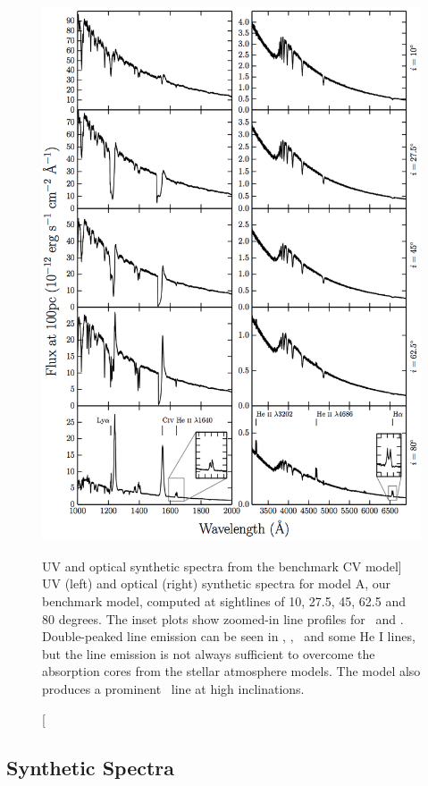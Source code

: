 \begin{figure}
\centering
\includegraphics[width=1.0\textwidth]{figures/05-cvpaper/modela_uv_opt.png}
\caption
[UV and optical synthetic spectra from the benchmark CV model]{
UV (left) and optical (right) synthetic spectra for model A, our benchmark model,
computed at sightlines of 10, 27.5, 45, 62.5 and 80 degrees.	
The inset plots show zoomed-in line profiles for 
\heiiuv\ and \ha. Double-peaked line emission can be seen in 
\heiiuv, \heiiopt, \ha\ and some He I lines, but the 
line emission is not always sufficient to overcome the absorption
cores from the stellar atmosphere models. The model
also produces a prominent \heiioptnew\ line at high inclinations.
}
\label{spec}
\end{figure}



\subsection{Synthetic Spectra}
\label{modela_spectrum}

